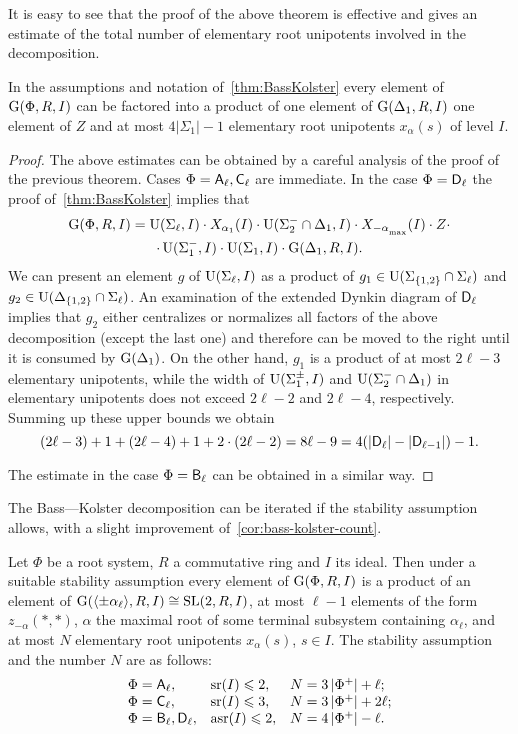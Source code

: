 It is easy to see that the proof of the above theorem is effective and gives an estimate of the total number of elementary root unipotents involved in the decomposition.
\begin{cor}\label{cor:bass-kolster-count}
In the assumptions and notation of~\cref{thm:BassKolster} every element of $\operatorname{G}(\Phi,R,I)$ 
can be factored into a product of one element of $\operatorname{G}(\Delta_1,R,I)$ one element of $Z$ and at most $4|\Sigma_1|-1$ elementary root unipotents $x_\alpha(s)$ of level $I$.
\end{cor}
\begin{proof}
The above estimates can be obtained by a careful analysis of the proof of the previous theorem.
Cases $\Phi=\mathsf{A}_\ell, \mathsf{C}_\ell$ are immediate.
In the case $\Phi=\mathsf{D}_\ell$ the proof of~\cref{thm:BassKolster} implies that
\begin{multline}\nonumber
\G(\Phi,R,I) =  \U(\Sigma_\ell,I) \cdot X_{\alpha_1}(I) \cdot \U(\Sigma_2^-\cap\Delta_1,I) \cdot X_{-\alpha\ssub{\mathrm{max}}}(I) \cdot Z  \cdot \\ \cdot \U(\Sigma_1^-,I) \cdot \U(\Sigma_1,I) \cdot \G(\Delta_1,R,I).
\end{multline}
We can present an element $g$ of $\operatorname{U}(\Sigma_\ell, I)$ as a product of $g_1 \in \operatorname{U}(\Sigma_{\{1,2\}} \cap \Sigma_\ell)$ and $g_2\in \operatorname{U}(\Delta_{\{1,2\}}\cap \Sigma_\ell)$.
An examination of the extended Dynkin diagram of $\mathsf{D}_\ell$ implies that $g_2$ either centralizes or normalizes all factors of the above decomposition (except the last one) and therefore can be moved to the right until it is consumed by $\operatorname{G}(\Delta_1)$.
On the other hand, $g_1$ is a product of at most $2\ell-3$ elementary unipotents, while the width of $\operatorname{U}(\Sigma_1^\pm, I)$ and $\operatorname{U}(\Sigma_2^-\cap\Delta_1)$ in elementary unipotents does not exceed $2\ell-2$ and $2\ell-4$, respectively.
Summing up these upper bounds we obtain
$$(2\ell-3) + 1 + (2\ell - 4) + 1 + 2\cdot (2\ell - 2) = 8\ell - 9 = 4(|\mathsf{D}_\ell| - |\mathsf{D}_{\ell-1}|) - 1.$$

The estimate in the case $\Phi=\mathsf{B}_\ell$ can be obtained in a similar way. \end{proof}
The Bass---Kolster decomposition can be iterated if the stability assumption allows, with a slight improvement of~\cref{cor:bass-kolster-count}.
\begin{cor}\label{cor:bass-kolster-iterated}
Let $\Phi$ be a root system, $R$ a commutative ring and $I$ its ideal. Then under a suitable stability assumption every element of $\operatorname{G}(\Phi,R,I)$ is a product of an element of $\operatorname{G}(\langle\pm\alpha_\ell\rangle,R,I)\cong\operatorname{SL}(2,R,I)$, at most $\ell-1$ elements of the form $z_{-\alpha}(*,*)$, $\alpha$ the maximal root of some terminal subsystem containing $\alpha_\ell$, and at most $N$ elementary root unipotents $x_\alpha(s)$, $s\in I$. The stability assumption and the number $N$ are as follows:
\[\begin{array}{l@{\quad}l@{\quad}l}
\Phi=\rA_\ell, & \sr(I)\leqslant 2, & N=3\left|\Phi^+\right|+\ell; \\
\Phi=\rC_\ell, & \sr(I)\leqslant 3, & N=3\left|\Phi^+\right|+2\ell; \\
\Phi=\rB_\ell,\rD_\ell, & \asr(I)\leqslant 2, & N=4\left|\Phi^+\right|-\ell.
\end{array}\]
\end{cor}

